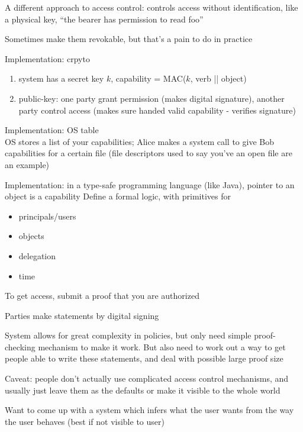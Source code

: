 A different approach to access control: controls access without identification,
like a physical key, ``the bearer has permission to read foo''

Sometimes make them revokable, but that's a pain to do in practice

Implementation: crpyto
\begin{enumerate}
    \item system has a secret key $k$, capability = MAC($k$, verb || object)
    \item public-key: one party grant permission (makes digital signature),
    another party control access (makes sure handed valid capability - verifies
    signature)
\end{enumerate}
Implementation: OS table\\
OS stores a list of your capabilities; Alice makes a system call to give Bob
capabilities for a certain file (file descriptors used to say you've an open
file are an example)

Implementation: in a type-safe programming language (like Java), pointer to an
object is a capability
Define a formal logic, with primitives for
\begin{itemize}
    \item principals/users
    \item objects
    \item delegation
    \item time
\end{itemize}
To get access, submit a proof that you are authorized

Parties make statements by digital signing

System allows for great complexity in policies, but only need simple proof-
checking mechanism to make it work. But also need to work out a way to get
people able to write these statements, and deal with possible large proof size

Caveat: people don't actually use complicated access control mechanisms, and
usually just leave them as the defaults or make it visible to the whole world

Want to come up with a system which infers what the user wants from the way the
user behaves (best if not visible to user)
